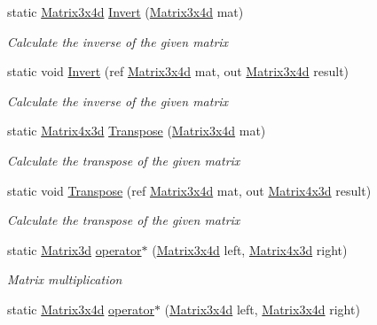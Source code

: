 \begin{DoxyCompactItemize}
static \hyperlink{struct_open_t_k_1_1_matrix3x4d}{Matrix3x4d} \hyperlink{struct_open_t_k_1_1_matrix3x4d_ac1815d250287d819d505676560f7f924}{Invert} (\hyperlink{struct_open_t_k_1_1_matrix3x4d}{Matrix3x4d} mat)
\begin{DoxyCompactList}\small\item\em Calculate the inverse of the given matrix \end{DoxyCompactList}\item 
static void \hyperlink{struct_open_t_k_1_1_matrix3x4d_a786c6964cd8a950cd50e7eaf52e96cb7}{Invert} (ref \hyperlink{struct_open_t_k_1_1_matrix3x4d}{Matrix3x4d} mat, out \hyperlink{struct_open_t_k_1_1_matrix3x4d}{Matrix3x4d} result)
\begin{DoxyCompactList}\small\item\em Calculate the inverse of the given matrix \end{DoxyCompactList}\item 
static \hyperlink{struct_open_t_k_1_1_matrix4x3d}{Matrix4x3d} \hyperlink{struct_open_t_k_1_1_matrix3x4d_a9886960b88412b792b8e19e39514329a}{Transpose} (\hyperlink{struct_open_t_k_1_1_matrix3x4d}{Matrix3x4d} mat)
\begin{DoxyCompactList}\small\item\em Calculate the transpose of the given matrix \end{DoxyCompactList}\item 
static void \hyperlink{struct_open_t_k_1_1_matrix3x4d_ae34420c44b12783e3c329d2228fd436b}{Transpose} (ref \hyperlink{struct_open_t_k_1_1_matrix3x4d}{Matrix3x4d} mat, out \hyperlink{struct_open_t_k_1_1_matrix4x3d}{Matrix4x3d} result)
\begin{DoxyCompactList}\small\item\em Calculate the transpose of the given matrix \end{DoxyCompactList}\item 
static \hyperlink{struct_open_t_k_1_1_matrix3d}{Matrix3d} \hyperlink{struct_open_t_k_1_1_matrix3x4d_a80cb16d0644776084a77d2661b3f9b39}{operator$\ast$} (\hyperlink{struct_open_t_k_1_1_matrix3x4d}{Matrix3x4d} left, \hyperlink{struct_open_t_k_1_1_matrix4x3d}{Matrix4x3d} right)
\begin{DoxyCompactList}\small\item\em Matrix multiplication \end{DoxyCompactList}\item 
static \hyperlink{struct_open_t_k_1_1_matrix3x4d}{Matrix3x4d} \hyperlink{struct_open_t_k_1_1_matrix3x4d_af48c26e0e7d223eef05f828eabba749f}{operator$\ast$} (\hyperlink{struct_open_t_k_1_1_matrix3x4d}{Matrix3x4d} left, \hyperlink{struct_open_t_k_1_1_matrix3x4d}{Matrix3x4d} right)

\end{DoxyCompactItemize}
